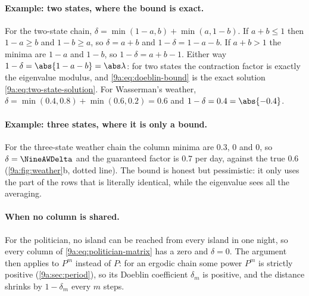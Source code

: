 \paragraph{Example: two states, where the bound is exact.}
For the two-state chain, $\delta=\min(1-a,b)+\min(a,1-b)$. If $a+b\le1$ then $1-a\ge b$ and
$1-b\ge a$, so $\delta=a+b$ and $1-\delta=1-a-b$. If $a+b>1$ the minima are $1-a$ and $1-b$, so
$1-\delta=a+b-1$. Either way $1-\delta=\abs{1-a-b}=\abs\lambda$: for two states the contraction
factor is exactly the eigenvalue modulus, and \eqref{9a:eq:doeblin-bound} is the exact solution
\eqref{9a:eq:two-state-solution}. For Wasserman's weather,
$\delta=\min(0.4,0.8)+\min(0.6,0.2)=0.6$ and $1-\delta=0.4=\abs{-0.4}$.

\paragraph{Example: three states, where it is only a bound.}
For the three-state weather chain the column minima are $0.3$, $0$ and $0$, so
$\delta=\NineAWDelta$ and the guaranteed factor is $0.7$ per day, against the true $0.6$
(\cref{9a:fig:weather}b, dotted line). The bound is honest but pessimistic: it only uses the part
of the rows that is literally identical, while the eigenvalue sees all the averaging.

\paragraph{When no column is shared.}
For the politician, no island can be reached from every island in one night, so every column of
\eqref{9a:eq:politician-matrix} has a zero and $\delta=0$. The argument then applies to $P^m$
instead of $P$: for an ergodic chain some power $P^m$ is strictly positive (\cref{9a:sec:period}),
so its Doeblin coefficient $\delta_m$ is positive, and the distance shrinks by $1-\delta_m$ every
$m$ steps.

